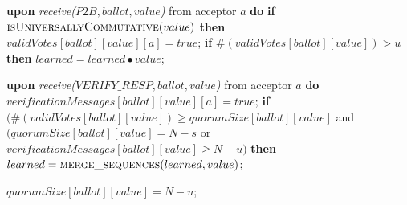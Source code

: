 \begin{algorithm}
\begin{algorithmic}[1]
			\State
		\State \textbf{upon} \textit{receive($P2B, ballot, value$)} from acceptor $a$ \textbf{do}
		\State \hspace{\algorithmicindent} \textbf{if} $\Call{isUniversallyCommutative}{value}$ \textbf{then}
		\State \hspace{\algorithmicindent}\hspace{\algorithmicindent}
		$validVotes[ballot][value][a] = true$;
		\State \hspace{\algorithmicindent}\hspace{\algorithmicindent} \textbf{if} $\#(validVotes[ballot][value]) > u$ \textbf{then} 
		\State \hspace{\algorithmicindent}\hspace{\algorithmicindent}\hspace{\algorithmicindent} $learned = learned \bullet value$;
		
		\State
		\State \textbf{upon} \textit{receive($VERIFY\_RESP, ballot, value$)} from acceptor $a$ \textbf{do}
		\State \hspace{\algorithmicindent} $verificationMessages[ballot][value][a]  = true$;
		\State \hspace{\algorithmicindent} \textbf{if} $(\#(validVotes[ballot][value]) \geq quorumSize[ballot][value]$ and $(quorumSize[ballot][value] = N-s$ or $verificationMessages[ballot][value] \geq N-u)$ \textbf{then}
		\State \hspace{\algorithmicindent}\hspace{\algorithmicindent} $learned = \Call{merge\_sequences}{learned, value}$;
		
		\State
		\State \hspace{\algorithmicindent} $quorumSize[ballot][value] = N-u$;


\end{algorithmic}
\end{algorithm}
